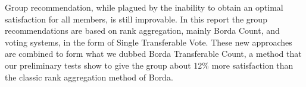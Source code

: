 Group recommendation, while plagued by the inability to obtain an optimal satisfaction for all members, is still improvable. In this report the group recommendations are based on rank aggregation, mainly Borda Count, and voting systems, in the form of Single Transferable Vote. These new approaches are combined to form what we dubbed Borda Transferable Count, a method that our preliminary tests show to give the group about 12\% more satisfaction than the classic rank aggregation method of Borda.